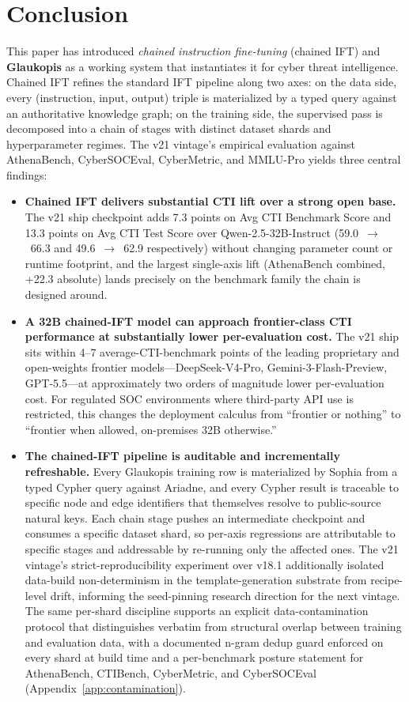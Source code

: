 \documentclass[webpdf,contemporary,large]{oup-authoring-template}
\theoremstyle{thmstyleone}
\theoremstyle{thmstyletwo}
\theoremstyle{thmstylethree}
\begin{document}
\section{Conclusion}

This paper has introduced \textit{chained instruction fine-tuning} (chained IFT) and \textbf{Glaukopis} as a working system that instantiates it for cyber threat intelligence. Chained IFT refines the standard IFT pipeline along two axes: on the data side, every (instruction, input, output) triple is materialized by a typed query against an authoritative knowledge graph; on the training side, the supervised pass is decomposed into a chain of stages with distinct dataset shards and hyperparameter regimes. The v21 vintage's empirical evaluation against AthenaBench, CyberSOCEval, CyberMetric, and MMLU-Pro yields three central findings:

\begin{itemize}
  \item \textbf{Chained IFT delivers substantial CTI lift over a strong open base.} The v21 ship checkpoint adds 7.3 points on Avg CTI Benchmark Score and 13.3 points on Avg CTI Test Score over Qwen-2.5-32B-Instruct (59.0~$\to$~66.3 and 49.6~$\to$~62.9 respectively) without changing parameter count or runtime footprint, and the largest single-axis lift (AthenaBench combined, +22.3 absolute) lands precisely on the benchmark family the chain is designed around.
  \item \textbf{A 32B chained-IFT model can approach frontier-class CTI performance at substantially lower per-evaluation cost.} The v21 ship sits within 4--7 average-CTI-benchmark points of the leading proprietary and open-weights frontier models---DeepSeek-V4-Pro, Gemini-3-Flash-Preview, GPT-5.5---at approximately two orders of magnitude lower per-evaluation cost. For regulated SOC environments where third-party API use is restricted, this changes the deployment calculus from ``frontier or nothing'' to ``frontier when allowed, on-premises 32B otherwise.''
  \item \textbf{The chained-IFT pipeline is auditable and incrementally refreshable.} Every Glaukopis training row is materialized by Sophia from a typed Cypher query against Ariadne, and every Cypher result is traceable to specific node and edge identifiers that themselves resolve to public-source natural keys. Each chain stage pushes an intermediate checkpoint and consumes a specific dataset shard, so per-axis regressions are attributable to specific stages and addressable by re-running only the affected ones. The v21 vintage's strict-reproducibility experiment over v18.1 additionally isolated data-build non-determinism in the template-generation substrate from recipe-level drift, informing the seed-pinning research direction for the next vintage. The same per-shard discipline supports an explicit data-contamination protocol that distinguishes verbatim from structural overlap between training and evaluation data, with a documented n-gram dedup guard enforced on every shard at build time and a per-benchmark posture statement for AthenaBench, CTIBench, CyberMetric, and CyberSOCEval (Appendix~\ref{app:contamination}).
\end{itemize}
\end{document}
